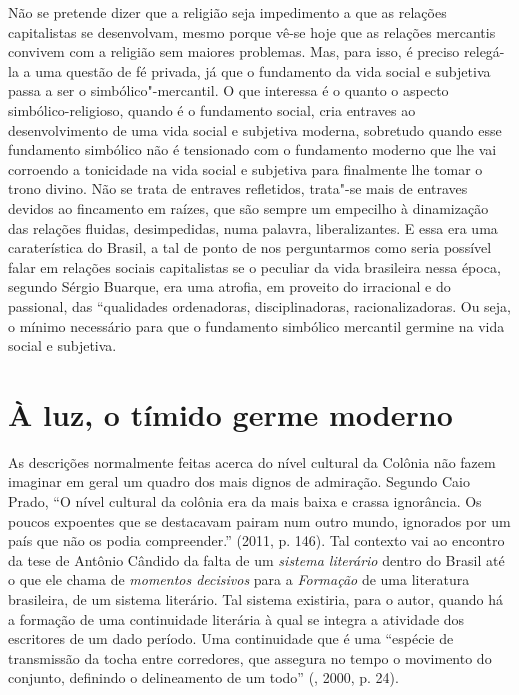 Não se pretende dizer que a religião seja impedimento a que as relações
capitalistas se desenvolvam, mesmo porque vê-se hoje que as relações
mercantis convivem com a religião sem maiores problemas. Mas, para isso,
é preciso relegá-la a uma questão de fé privada, já que o fundamento da
vida social e subjetiva passa a ser o simbólico"-mercantil. O que interessa
é o quanto o aspecto simbólico-religioso, quando é o fundamento social,
cria entraves ao desenvolvimento de uma vida social e subjetiva moderna,
sobretudo quando esse fundamento simbólico não é tensionado com o
fundamento moderno que lhe vai corroendo a tonicidade na vida social e
subjetiva para finalmente lhe tomar o trono divino. Não se
trata de entraves refletidos, trata"-se mais de entraves devidos ao
fincamento em raízes, que são sempre um empecilho à dinamização das
relações fluidas, desimpedidas, numa palavra, liberalizantes. E essa era
uma caraterística do Brasil, a tal de ponto de nos perguntarmos como
seria possível falar em relações sociais capitalistas se o peculiar da
vida brasileira nessa época, segundo Sérgio Buarque, era uma atrofia, em
proveito do irracional e do passional, das ``qualidades ordenadoras,
disciplinadoras, racionalizadoras. Ou seja, o mínimo necessário para
que o fundamento simbólico mercantil germine na vida social e subjetiva.

\section{À luz, o tímido germe moderno}

As descrições normalmente feitas acerca do nível cultural da Colônia não
fazem imaginar em geral um quadro dos mais dignos de admiração. Segundo
Caio Prado, ``O nível cultural da colônia era da mais baixa e crassa
ignorância. Os poucos expoentes que se destacavam pairam num outro
mundo, ignorados por um país que não os podia compreender.'' (2011, p.
146). Tal contexto vai ao encontro da tese de Antônio Cândido da falta
de um \emph{sistema literário} dentro do Brasil até o que ele chama de
\emph{momentos decisivos} para a \emph{Formação} de uma literatura
brasileira, de um sistema literário. Tal sistema existiria, para o
autor, quando há a formação de uma continuidade literária à qual se
integra a atividade dos escritores de um dado período. Uma continuidade
que é uma ``espécie de transmissão da tocha entre corredores, que
assegura no tempo o movimento do conjunto, definindo o delineamento de
um todo'' (, 2000, p. 24).

